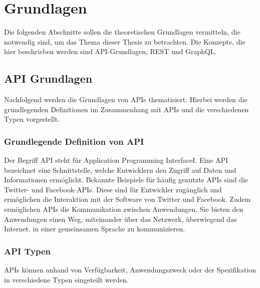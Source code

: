 \chapter{Grundlagen} %
\label{sec:grundlagen}
Die folgenden Abschnitte sollen die theoretischen Grundlagen vermitteln, die notwendig sind, um das Thema dieser Thesis zu betrachten. Die Konzepte, die hier beschrieben werden sind API-Grundlagen, REST und GraphQL.
\section{API Grundlagen} %
\label{sec:apigrundlagen}
Nachfolgend werden die Grundlagen von APIs thematisiert. Hierbei werden die grundlegenden Definitionen im Zusammenhang mit APIs und die verschiedenen Typen vorgestellt.
\subsection{Grundlegende Definition von API} %
\label{sec:grundlegendedefinitionvonapi}
Der Begriff \glqq API\grqq{}  steht für \glqq Application Programming InterfaceI\grqq{}. Eine API bezeichnet eine Schnittstelle, welche Entwicklern den Zugriff auf Daten und Informationen ermöglicht. Bekannte Beispiele für häufig genutzte APIs sind die Twitter- und Facebook-APIs. Diese sind für Entwickler zugänglich und ermöglichen die Interaktion mit der Software von Twitter und Facebook. Zudem ermöglichen APIs die Kommunikation zwischen Anwendungen. Sie bieten den Anwendungen einen Weg, miteinander über das Netzwerk, überwiegend das Internet, in einer gemeinsamen Sprache zu kommunizieren. \citep{apistrategyguide}
\newpage
\subsection{API Typen} %
\label{sec:apitypen}
APIs können anhand von Verfügbarkeit, Anwendungszweck oder der Spezifikation in verschiedene Typen eingeteilt werden.

